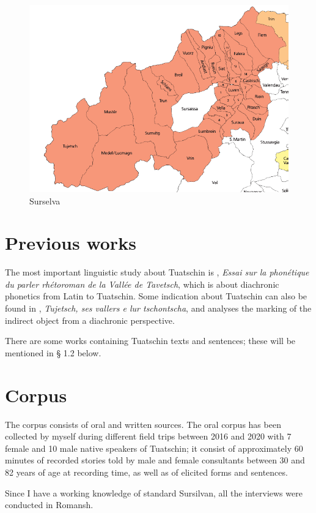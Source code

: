 \begin{figure}
	\includegraphics[height=.5\textheight]{figures/Surselva.png}
	\caption{Surselva}
	\label{fig:surs}
\end{figure}


\section{Previous works}
The most important linguistic study about Tuatschin is  \citet{Caduff1952}, \textit{Essai sur la phonétique du parler rhétoroman de la Vallée de Tavetsch}, which is about diachronic phonetics from Latin to Tuatschin. Some indication about Tuatschin can also be found in \citet{VicHendry2010}, \textit{Tujetsch, ses vallers e lur tschontscha}, and \citet{Maurer2017} analyses the marking of the indirect object from a diachronic perspective. 

There are some works containing Tuatschin texts and sentences; these will be mentioned in § 1.2 below.

\section{Corpus}
The corpus consists of oral and written sources. The oral corpus has been collected by myself during different field trips between 2016 and 2020 with 7 female and 10 male native speakers of Tuatschin; it consist of approximately 60 minutes of recorded stories told by male and female consultants between 30 and 82 years of age at recording time, as well as of elicited forms and sentences.

Since I have a working knowledge of standard Sursilvan, all the interviews were conducted in Romansh.

